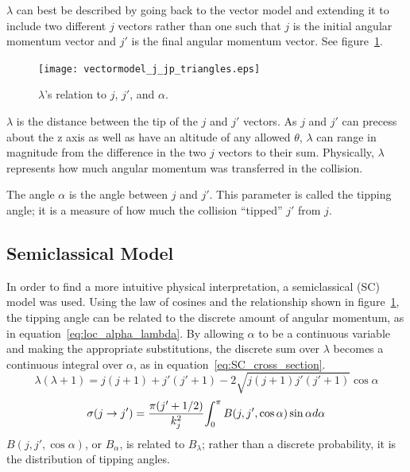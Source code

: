 \documentclass[letterpaper,titlepage,12pt]{article}
\begin{document}
\(\lambda\) can best be described by going back to the vector model and extending it to include two
different \(j\) vectors rather than one such that \(j\) is the initial angular
momentum vector and \(j'\) is the final angular momentum vector.  See
figure~\ref{fig:vectormodel_j_jp}.
\begin{figure}[h]
    \centering
    \texttt{[image: vectormodel\_j\_jp\_triangles.eps]}
    \caption{\(\lambda\)'s relation to \(j\), \(j'\), and \(\alpha\).}
\label{fig:vectormodel_j_jp}
\end{figure}

\(\lambda\) is the distance between the tip of the \(j\) and \(j'\) vectors.
As \(j\) and \(j'\) can precess about the z axis as well as have an altitude of
any allowed \(\theta\), \(\lambda\) can range in magnitude from the difference
in the two \(j\) vectors to their sum.  Physically, \(\lambda\) represents how much
angular momentum was transferred in the collision.

The angle \(\alpha\) is the angle between \(j\) and \(j'\).  This parameter is
called the tipping angle; it is a measure of how much the collision ``tipped''
\(j'\) from \(j\).

\newpage
\subsection{Semiclassical Model}
In order to find a more intuitive physical interpretation, a semiclassical (SC)
model was used.  Using the law of cosines and the relationship shown in
figure~\ref{fig:vectormodel_j_jp}, the tipping angle can be related to the
discrete amount of angular momentum, as in equation~\ref{eq:loc_alpha_lambda}. 
By allowing \(\alpha\) to be a continuous variable and making the appropriate
substitutions, the discrete sum over \(\lambda\) becomes a continuous integral
over \(\alpha\), as in equation~\ref{eq:SC_cross_section}.
\begin{equation}
    \lambda(\lambda+1)=j(j+1)+j'(j'+1)-2\sqrt{j(j+1)j'(j'+1)}\cos\alpha
    \label{eq:loc_alpha_lambda}
\end{equation}
\begin{equation}
    \sigma(j\rightarrow j')={{\pi(j'+1/2)}\over{k_j^2}}{\int_{0}^{\pi}{B(j,j',\cos\alpha)\sin\alpha d\alpha}}
    \label{eq:SC_cross_section}
\end{equation}
\(B(j,j',\cos\alpha)\), or \(B_\alpha\), is related to \(B_\lambda\); rather
than a discrete probability, it is the distribution of tipping angles.
\end{document}
